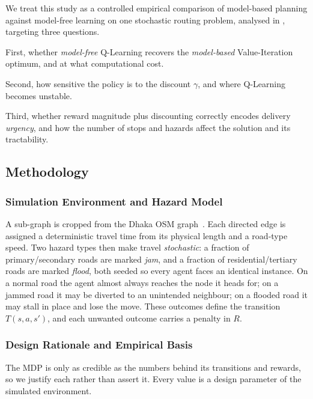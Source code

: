 \documentclass{ai-lab-report}
\begin{document}
We treat this study as a controlled empirical comparison of model-based planning against model-free learning on one stochastic routing problem, analysed in , targeting three questions. 

First, whether \emph{model-free} Q-Learning recovers the \emph{model-based} Value-Iteration optimum, and at what computational cost. 

Second, how sensitive the policy is to the discount $\gamma$, and where Q-Learning becomes unstable. 

Third, whether reward magnitude plus discounting correctly encodes delivery \emph{urgency}, and how the number of stops and hazards affect the solution and its tractability.

\subsection{Methodology}

\subsubsection{Simulation Environment and Hazard Model}
A sub-graph is cropped from the Dhaka OSM graph~\citep{boeing2017osmnx}. Each directed edge is assigned a deterministic travel time from its physical length and a road-type speed. Two hazard types then make travel \emph{stochastic}: a fraction of primary/secondary roads are marked \emph{jam}, and a fraction of residential/tertiary roads are marked \emph{flood}, both seeded so every agent faces an identical instance. On a normal road the agent almost always reaches the node it heads for; on a jammed road it may be diverted to an unintended neighbour; on a flooded road it may stall in place and lose the move. These outcomes define the transition $T(s,a,s')$, and each unwanted outcome carries a penalty in $R$.

\subsubsection{Design Rationale and Empirical Basis}
\label{sec:a4defend}

The MDP is only as credible as the numbers behind its transitions and rewards, so we justify each rather than assert it. Every value is a design parameter of the simulated environment.
\end{document}
